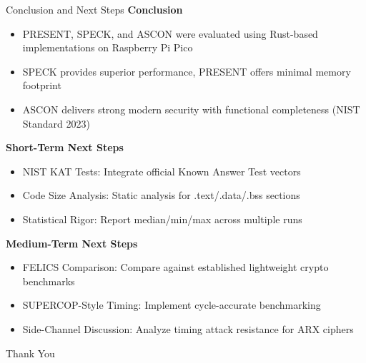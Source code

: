 \documentclass[aspectratio=169]{beamer}
\begin{document}
\begin{frame}{Conclusion and Next Steps}
\textbf{Conclusion}
\begin{itemize}
    \item PRESENT, SPECK, and ASCON were evaluated using Rust-based implementations on Raspberry Pi Pico
    \item SPECK provides superior performance, PRESENT offers minimal memory footprint
    \item ASCON delivers strong modern security with functional completeness (NIST Standard 2023)
\end{itemize}

\vspace{0.3cm}
\textbf{Short-Term Next Steps}
\begin{itemize}
    \item NIST KAT Tests: Integrate official Known Answer Test vectors
    \item Code Size Analysis: Static analysis for .text/.data/.bss sections
    \item Statistical Rigor: Report median/min/max across multiple runs
\end{itemize}

\vspace{0.2cm}
\textbf{Medium-Term Next Steps}
\begin{itemize}
    \item FELICS Comparison: Compare against established lightweight crypto benchmarks
    \item SUPERCOP-Style Timing: Implement cycle-accurate benchmarking
    \item Side-Channel Discussion: Analyze timing attack resistance for ARX ciphers
\end{itemize}
\end{frame}

\begin{frame}
\Huge Thank You\\
\vspace{0.5cm}
\end{frame}
\end{document}
